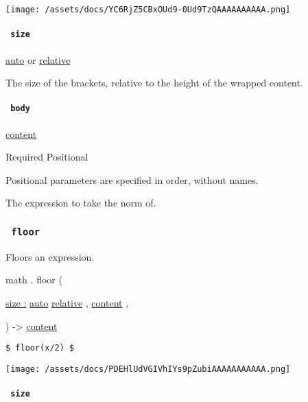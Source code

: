 \texttt{[image: /assets/docs/YC6RjZ5CBxOUd9-0Ud9TzQAAAAAAAAAA.png]}

\paragraph{\texorpdfstring{\texttt{\ size\ }}{ size }}\label{functions-norm-size}

\href{/docs/reference/foundations/auto/}{auto} {or}
\href{/docs/reference/layout/relative/}{relative}

The size of the brackets, relative to the height of the wrapped content.

\paragraph{\texorpdfstring{\texttt{\ body\ }}{ body }}\label{functions-norm-body}

\href{/docs/reference/foundations/content/}{content}

{Required} {{ Positional }}

\label{functions-norm-body-positional-tooltip}
Positional parameters are specified in order, without names.

The expression to take the norm of.

\subsubsection{\texorpdfstring{\texttt{\ floor\ }}{ floor }}\label{functions-floor}

Floors an expression.

math { . } { floor } (

{ \hyperref[functions-floor-parameters-size]{size :}
\href{/docs/reference/foundations/auto/}{auto}
\href{/docs/reference/layout/relative/}{relative} , } {
\href{/docs/reference/foundations/content/}{content} , }

) -\textgreater{} \href{/docs/reference/foundations/content/}{content}

\begin{verbatim}
$ floor(x/2) $
\end{verbatim}

\texttt{[image: /assets/docs/PDEHlUdVGIVhIYs9pZubiAAAAAAAAAAA.png]}

\paragraph{\texorpdfstring{\texttt{\ size\ }}{ size }}\label{functions-floor-size}

